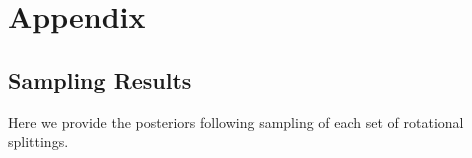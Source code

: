 \section*{Appendix}
\subsection*{Sampling Results}
Here we provide the posteriors following sampling of each set of rotational splittings.



